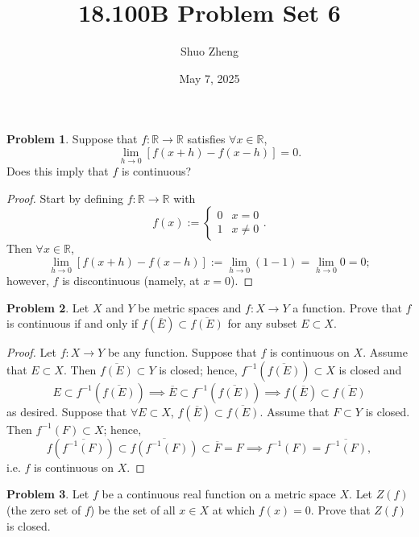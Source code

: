 \documentclass{amsart}
\title{18.100B Problem Set 6}
\author{Shuo Zheng}
\date{May 7, 2025}
\theoremstyle{definition}
\newtheorem{problem}{Problem}
\begin{document}
\maketitle

\begin{problem}
    Suppose that $f: \mathbb{R} \to \mathbb{R}$ satisfies $\forall x \in \mathbb{R}$, 
    \[
    \lim_{h \to 0}[f(x + h) - f(x - h)] = 0.
    \]
    Does this imply that $f$ is continuous?
\end{problem}

\begin{proof}
    Start by defining $f: \mathbb{R} \to \mathbb{R}$ with 
    \[
    f(x) := \begin{cases}
        0 & x = 0 \\
        1 & x \neq 0
    \end{cases}.
    \]
    Then $\forall x \in \mathbb{R}$,
    \[
    \lim_{h \to 0}[f(x + h) - f(x - h)] := \lim_{h \to 0}(1 - 1) = \lim_{h \to 0}0 = 0;
    \]
    however, $f$ is discontinuous (namely, at $x = 0$). 
\end{proof}

\begin{problem}
    Let $X$ and $Y$ be metric spaces and $f: X \to Y$ a function. Prove that $f$ is continuous if and only if $f(\overline{E}) \subset \overline{f(E)}$ for any subset $E \subset X$. 
\end{problem}

\begin{proof}
    Let $f: X \to Y$ be any function. Suppose that $f$ is continuous on $X$. Assume that $E \subset X$. Then $\overline{f(E)} \subset Y$ is closed; hence, $f^{-1}(\overline{f(E)}) \subset X$ is closed and 
    \[
    E \subset f^{-1}(\overline{f(E)}) \implies \overline{E} \subset f^{-1}(\overline{f(E)}) \implies f(\overline{E}) \subset \overline{f(E)}
    \]
    as desired. Suppose that $\forall E \subset X$, $f(\overline{E}) \subset \overline{f(E)}$. Assume that $F \subset Y$ is closed. Then $f^{-1}(F) \subset X$; hence,
    \[
    f(\overline{f^{-1}(F)}) \subset \overline{f(f^{-1}(F))} \subset \overline{F} = F \implies f^{-1}(F) = \overline{f^{-1}(F)},
    \]
    i.e. $f$ is continuous on $X$.
\end{proof}

\begin{problem}
    Let $f$ be a continuous real function on a metric space $X$. Let $Z(f)$ (the zero set of $f$) be the set of all $x \in X$ at which $f(x) = 0$. Prove that $Z(f)$ is closed.
\end{problem}
\end{document}
